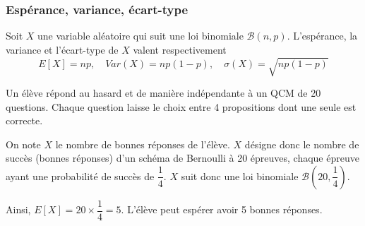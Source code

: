 \documentclass[11pt,fleqn, openany]{book} %
\begin{document}
\subsubsection{Espérance, variance, écart-type}

\begin{proposition}Soit $X$ une variable aléatoire qui suit une loi binomiale $\mathcal{B}(n,p)$. L'espérance, la variance et l'écart-type de $X$ valent respectivement \[E[X]=np, \quad Var(X)=np(1-p), \quad \sigma(X)=\sqrt{np(1-p)}\]\end{proposition}

\begin{example}Un élève répond au hasard et de manière indépendante à un QCM de 20 questions. Chaque question laisse le choix entre 4 propositions dont une seule est correcte.

On note $X$ le nombre de bonnes réponses de l'élève. $X$ désigne donc le nombre de succès (bonnes réponses) d'un schéma de Bernoulli à 20 épreuves, chaque épreuve ayant une probabilité de succès de $\dfrac{1}{4}$. $X$ suit donc une loi binomiale $\mathcal{B}\left(20,\dfrac{1}{4}\right)$.

Ainsi, $E[X]=20 \times \dfrac{1}{4}=5$. L'élève peut espérer avoir 5 bonnes réponses.\end{example}
\end{document}
